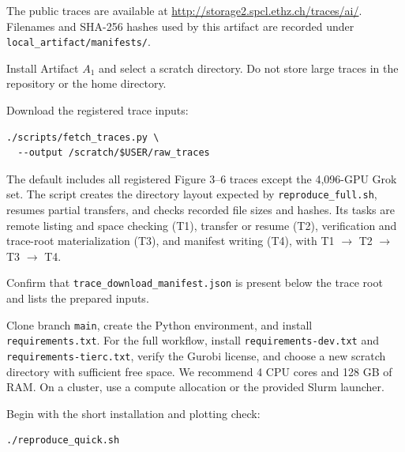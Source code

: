 \documentclass[conference]{IEEEtran}
\begin{document}

The public traces are available at
\url{http://storage2.spcl.ethz.ch/traces/ai/}.
Filenames and SHA-256 hashes used by this artifact are recorded under
\texttt{local\_artifact/manifests/}.


Install Artifact $A_1$ and select a scratch directory. Do not store large
traces in the repository or the home directory.

\artcomp

Download the registered trace inputs:

\begin{verbatim}
./scripts/fetch_traces.py \
  --output /scratch/$USER/raw_traces
\end{verbatim}

The default includes all registered Figure 3--6 traces except the
4,096-GPU Grok set. The script creates the directory layout expected by
\texttt{reproduce\_full.sh}, resumes partial transfers, and checks recorded
file sizes and hashes. Its tasks are remote listing and space checking (T1),
transfer or resume (T2), verification and trace-root materialization (T3),
and manifest writing (T4), with T1 $\rightarrow$ T2 $\rightarrow$ T3
$\rightarrow$ T4.

\artout

Confirm that \texttt{trace\_download\_manifest.json} is present below the
trace root and lists the prepared inputs.


\appendixAE


\artin

Clone branch \texttt{main}, create the Python environment,
and install \texttt{requirements.txt}. For the full workflow, install
\texttt{requirements-dev.txt} and \texttt{requirements-tierc.txt}, verify
the Gurobi license, and choose a new scratch directory with sufficient
free space. We recommend 4 CPU cores and 128 GB of RAM. On a cluster,
use a compute allocation or the provided Slurm launcher.

\artcomp

Begin with the short installation and plotting check:

\begin{verbatim}
./reproduce_quick.sh
\end{verbatim}
\end{document}
